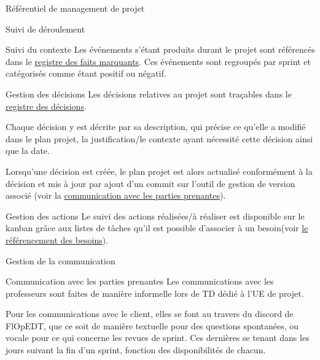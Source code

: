 \documentclass[]{article}
\begin{document}
{\begin{section}{\label{sec:Référentiel de management de projet}Référentiel de management de projet}
     \begin{subsection}{\label{sec:Suivi de déroulement}Suivi de déroulement}
         \begin{subsubsection}{\label{sec:Suivi du contexte}Suivi du contexte}
             Les événements s'étant produits durant le projet sont référencés dans le \href{documents/Registre_des_faits_marquants.pdf}{registre des faits marquants}. Ces événements sont regroupés par sprint et catégorisés comme étant positif ou négatif.
         \end{subsubsection}

         \begin{subsubsection}{\label{sec:Gestion des décision}Gestion des décisions}
             Les décisions relatives au projet sont traçables dans le \href{documents/Registre_des_décisions.pdf}{registre des décisions}.

             Chaque décision y est décrite par sa description, qui précise ce qu’elle a modifié dans le plan projet, la justification/le contexte ayant nécessité cette décision ainsi que la date.

             Lorsqu’une décision est créée, le plan projet est alors actualisé conformément à la décision et mis à jour par ajout d'un commit sur l’outil de gestion de version associé (voir la \hyperref[sec:Communication avec les parties prenantes]{communication avec les parties prenantes}).
         \end{subsubsection}

         \begin{subsubsection}{\label{sec:Gestion des actions}Gestion des actions}
             Le suivi des actions réalisées/à réaliser est disponible sur le kanban grâce aux listes de tâches qu’il est possible d’associer à un besoin(voir \hyperref[sec:Référencement des besoins]{le référencement des besoins}).
         \end{subsubsection}
     \end{subsection}

     \begin{subsection}{\label{sec:Gestion de la communication}Gestion de la communication}
         \begin{subsubsection}{\label{sec:Communication avec les parties prenantes}Communication avec les parties prenantes}
             Les communications avec les professeurs sont faites de manière informelle lors de TD dédié à l’UE de projet.

             Pour les communications avec le client, elles se font au travers du discord de FlOpEDT, que ce soit de manière textuelle pour des questions spontanées, ou vocale pour ce qui concerne les revues de sprint. Ces dernières se tenant dans les jours suivant la fin d’un sprint, fonction des disponibilités de chacun.


\end{subsubsection}
\end{subsection}
\end{section}}
\end{document}
